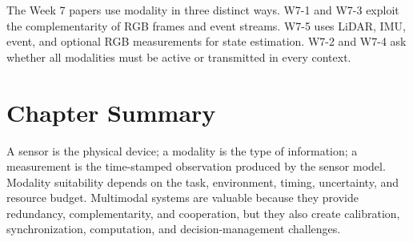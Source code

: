 \begin{paperconnection}
The Week 7 papers use modality in three distinct ways. W7-1 and W7-3 exploit the complementarity of RGB frames and event streams. W7-5 uses LiDAR, IMU, event, and optional RGB measurements for state estimation. W7-2 and W7-4 ask whether all modalities must be active or transmitted in every context.
\end{paperconnection}

\section{Chapter Summary}

A sensor is the physical device; a modality is the type of information; a measurement is the time-stamped observation produced by the sensor model. Modality suitability depends on the task, environment, timing, uncertainty, and resource budget. Multimodal systems are valuable because they provide redundancy, complementarity, and cooperation, but they also create calibration, synchronization, computation, and decision-management challenges.
